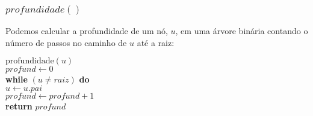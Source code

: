 \documentclass{beamer}
\begin{document}
\begin{frame}
\frametitle{$profundidade()$}
Podemos calcular a profundidade de um nó, \ensuremath{\ensuremath{\ensuremath{\mathit{u}}}}, em uma árvore binária contando
o número de passos no caminho de \ensuremath{\ensuremath{\ensuremath{\mathit{u}}}} até a raiz:
\begin{oframed}
\begin{flushleft}
\hspace*{1em} \ensuremath{\mathrm{profundidade}(\ensuremath{\mathit{u}})}\\
\hspace*{1em} \hspace*{1em} \ensuremath{\ensuremath{\mathit{profund}} \gets  \ensuremath{0}}\\
\hspace*{1em} \hspace*{1em} {\color{black} \textbf{while}} \ensuremath{(\ensuremath{\mathit{u}} \ne \ensuremath{\mathit{raiz}})} {\color{black} \textbf{do}} \\
\hspace*{1em} \hspace*{1em} \hspace*{1em} \ensuremath{\ensuremath{\mathit{u}} \gets  \ensuremath{\ensuremath{\mathit{u}}.pai}}\\
\hspace*{1em} \hspace*{1em} \hspace*{1em} \ensuremath{\ensuremath{\mathit{profund}} \gets  \ensuremath{\ensuremath{\mathit{profund}} + 1}}\\
\hspace*{1em} \hspace*{1em} {\color{black} \textbf{return}} \ensuremath{\ensuremath{\mathit{profund}}}\\
\end{flushleft}
\end{oframed}
\end{frame}
\end{document}
